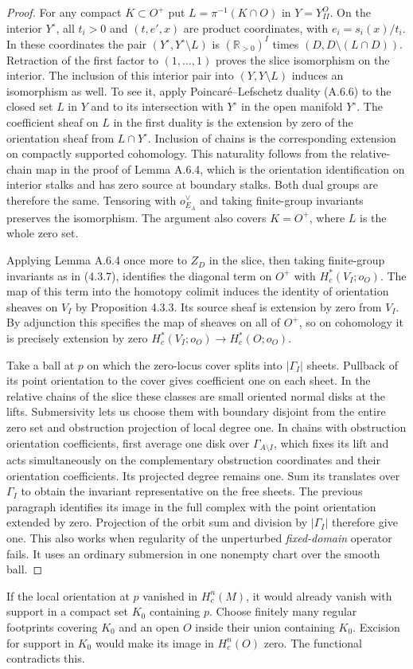 \begin{proof}
For any compact $K\subset O^+$ put $L=\pi^{-1}(K\cap O)$ in
$Y=Y_{II}^O$. On the interior $Y^\circ$, all $t_i>0$ and
$(t,e',x)$ are product coordinates, with $e_i=s_i(x)/t_i$.
In these coordinates the pair $(Y^\circ,Y^\circ\setminus L)$
is $(\mathbb R_{>0})^{I}$ times
$(D,D\setminus(L\cap D))$. Retraction of the first factor to
$(1,\ldots,1)$ proves the slice isomorphism on the interior.
The inclusion of this interior pair into $(Y,Y\setminus L)$
induces an isomorphism as well. To see it, apply Poincaré--Lefschetz
duality (A.6.6) to the closed set $L$ in $Y$ and to its intersection
with $Y^\circ$ in the open manifold $Y^\circ$. The coefficient
sheaf on $L$ in the first duality is the extension by zero of the
orientation sheaf from $L\cap Y^\circ$. Inclusion of chains is the
corresponding extension on compactly supported cohomology. This
naturality follows from the relative-chain map in the proof of
Lemma A.6.4, which is the orientation identification on interior
stalks and has zero source at boundary stalks. Both dual groups are
therefore the same. Tensoring with $o_{E_A}^\vee$ and taking
finite-group invariants preserves the isomorphism. The argument
also covers $K=O^+$, where $L$ is the whole zero set.

Applying Lemma A.6.4 once more to $Z_D$ in the slice, then taking
finite-group invariants as in (4.3.7), identifies the diagonal
term on $O^+$ with $H_c^*(V_I;o_O)$. The map of this term into
the homotopy colimit induces the identity of orientation sheaves
on $V_I$ by Proposition 4.3.3. Its source sheaf is extension by
zero from $V_I$. By adjunction this specifies the map of sheaves
on all of $O^+$, so on cohomology it is precisely extension by
zero $H_c^*(V_I;o_O)\to H_c^*(O;o_O)$.

Take a ball at $p$ on which the zero-locus cover splits into
$|\Gamma_I|$ sheets. Pullback of its point orientation to the
cover gives coefficient one on each sheet. In the relative chains
of the slice these classes are small oriented normal disks at the
lifts. Submersivity lets us choose them with boundary disjoint
from the entire zero set and obstruction projection of local degree
one. In chains with obstruction orientation coefficients, first
average one disk over $\Gamma_{A\setminus I}$, which fixes its
lift and acts simultaneously on the complementary obstruction
coordinates and their orientation coefficients. Its projected
degree remains one. Sum its translates over $\Gamma_I$ to obtain
the invariant representative on the free sheets. The
previous paragraph identifies its image in the full complex with
the point orientation extended by zero. Projection of the orbit sum
and division by $|\Gamma_I|$ therefore give one. This also works when regularity of
the unperturbed \emph{fixed-domain} operator fails. It uses an ordinary
submersion in one nonempty chart over the smooth ball.
\end{proof}
If the local orientation at $p$ vanished in $H_c^n(M)$, it would
already vanish with support in a compact set $K_0$ containing
$p$. Choose finitely many regular footprints covering $K_0$ and
an open $O$ inside their union containing $K_0$. Excision for
support in $K_0$ would make its image in $H_c^n(O)$ zero. The
functional contradicts this.


